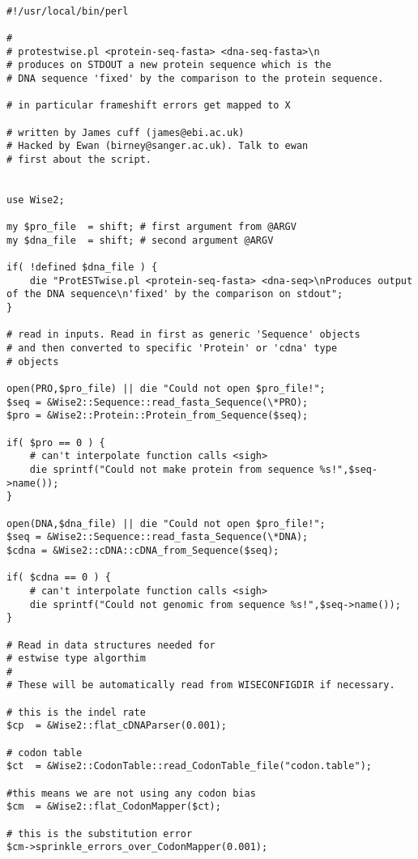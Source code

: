 \documentclass{article}
\begin{document}
\begin{verbatim}

#!/usr/local/bin/perl

#
# protestwise.pl <protein-seq-fasta> <dna-seq-fasta>\n
# produces on STDOUT a new protein sequence which is the 
# DNA sequence 'fixed' by the comparison to the protein sequence.

# in particular frameshift errors get mapped to X

# written by James cuff (james@ebi.ac.uk)
# Hacked by Ewan (birney@sanger.ac.uk). Talk to ewan
# first about the script.


use Wise2;

my $pro_file  = shift; # first argument from @ARGV
my $dna_file  = shift; # second argument @ARGV

if( !defined $dna_file ) {
    die "ProtESTwise.pl <protein-seq-fasta> <dna-seq>\nProduces output of the DNA sequence\n'fixed' by the comparison on stdout";
}

# read in inputs. Read in first as generic 'Sequence' objects
# and then converted to specific 'Protein' or 'cdna' type
# objects
 
open(PRO,$pro_file) || die "Could not open $pro_file!";
$seq = &Wise2::Sequence::read_fasta_Sequence(\*PRO);
$pro = &Wise2::Protein::Protein_from_Sequence($seq);

if( $pro == 0 ) {
    # can't interpolate function calls <sigh>
    die sprintf("Could not make protein from sequence %s!",$seq->name());
}

open(DNA,$dna_file) || die "Could not open $pro_file!";
$seq = &Wise2::Sequence::read_fasta_Sequence(\*DNA);
$cdna = &Wise2::cDNA::cDNA_from_Sequence($seq);

if( $cdna == 0 ) {
    # can't interpolate function calls <sigh>
    die sprintf("Could not genomic from sequence %s!",$seq->name());
}

# Read in data structures needed for 
# estwise type algorthim
#
# These will be automatically read from WISECONFIGDIR if necessary.

# this is the indel rate
$cp  = &Wise2::flat_cDNAParser(0.001);

# codon table
$ct  = &Wise2::CodonTable::read_CodonTable_file("codon.table");

#this means we are not using any codon bias
$cm  = &Wise2::flat_CodonMapper($ct);

# this is the substitution error
$cm->sprinkle_errors_over_CodonMapper(0.001);


\end{verbatim}
\end{document}
